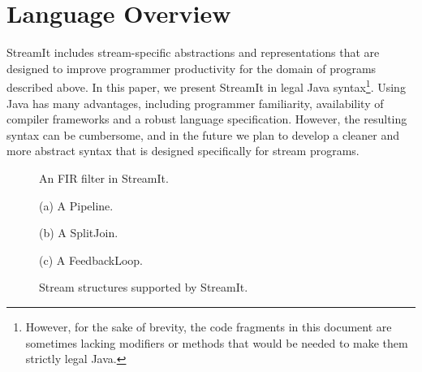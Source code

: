 
\section{Language Overview}
\label{sec:overview}

StreamIt includes stream-specific abstractions and representations
that are designed to improve programmer productivity for the domain of
programs described above.  In this paper, we present StreamIt in legal
Java syntax\footnote{However, for the sake of brevity, the code
fragments in this document are sometimes lacking modifiers or methods
that would be needed to make them strictly legal Java.}.  Using Java
has many advantages, including programmer familiarity, availability of
compiler frameworks and a robust language specification.  However, the
resulting syntax can be cumbersome, and in the future we plan to
develop a cleaner and more abstract syntax that is designed
specifically for stream programs.

\begin{figure}[htpb]
\begin{minipage}{3in}
\vspace{10pt}
\caption{\protect\small An FIR filter in StreamIt.~~~~~
\protect\label{fig:firstreamit}}
\end{minipage}
\begin{minipage}{3in}
\centering
\vspace{10pt}

(a) A Pipeline. \\
\vspace{10pt}

(b) A SplitJoin. \\
\vspace{10pt}

(c) A FeedbackLoop. \\
\caption{\protect\small Stream structures supported by StreamIt.
\protect\label{fig:structuresp}
}
\end{minipage}
\end{figure}

